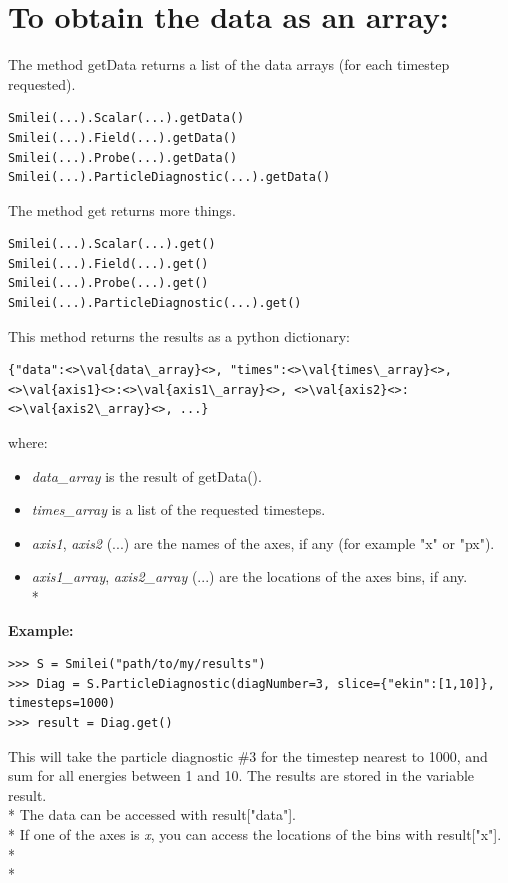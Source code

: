 \documentclass[11pt]{article}
\newcommand{\code}[1]{\colorbox{yellow!15}{\ttfamily #1}}
\newcommand{\val}[1]{{\ttfamily \textit{#1}}}
\begin{document}
\section{To obtain the data as an array:}
The method \code{getData} returns a list of the data arrays (for each timestep requested).
\begin{lstlisting}
Smilei(...).Scalar(...).getData()
Smilei(...).Field(...).getData()
Smilei(...).Probe(...).getData()
Smilei(...).ParticleDiagnostic(...).getData()
\end{lstlisting}

The method \code{get} returns more things.
\begin{lstlisting}
Smilei(...).Scalar(...).get()
Smilei(...).Field(...).get()
Smilei(...).Probe(...).get()
Smilei(...).ParticleDiagnostic(...).get()
\end{lstlisting}
This method returns the results as a python dictionary:
\begin{lstlisting}
{"data":<>\val{data\_array}<>, "times":<>\val{times\_array}<>, <>\val{axis1}<>:<>\val{axis1\_array}<>, <>\val{axis2}<>:<>\val{axis2\_array}<>, ...}
\end{lstlisting}
where:
\begin{itemize}
\item \val{data\_array} is the result of \code{getData()}.
\item \val{times\_array} is a list of the requested timesteps.
\item \val{axis1}, \val{axis2} (...) are the names of the axes, if any (for example \code{"x"} or \code{"px"}).
\item \val{axis1\_array}, \val{axis2\_array} (...) are the locations of the axes bins, if any.\\*
\end{itemize}

\textbf{Example:}
\begin{lstlisting}
>>> S = Smilei("path/to/my/results")
>>> Diag = S.ParticleDiagnostic(diagNumber=3, slice={"ekin":[1,10]}, timesteps=1000)
>>> result = Diag.get()
\end{lstlisting}
This will take the particle diagnostic \#3 for the timestep nearest to 1000, and sum for all energies between 1 and 10.
The results are stored in the variable \code{result}.\\*
The data can be accessed with \code{result["data"]}.\\*
If one of the axes is \val{x}, you can access the locations of the bins with \code{result["x"]}.\\* \\*
\end{document}
